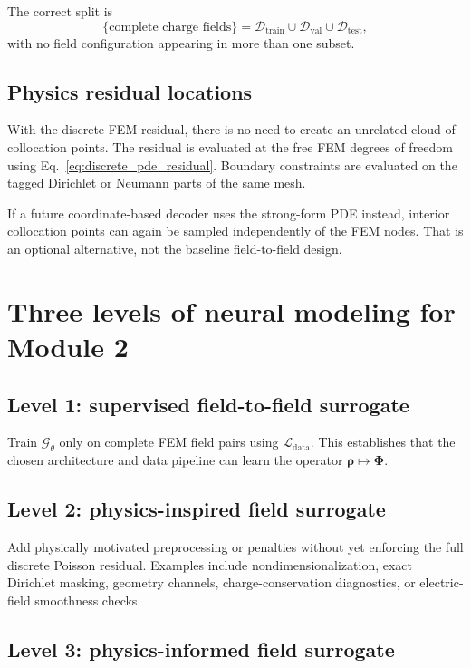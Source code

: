 \documentclass[11pt]{article}
\newcommand{\Ldata}{\mathcal{L}_{\mathrm{data}}}
\begin{document}
The correct split is
\begin{equation}
\{\text{complete charge fields}\}
=\mathcal{D}_{\mathrm{train}}\cup\mathcal{D}_{\mathrm{val}}\cup\mathcal{D}_{\mathrm{test}},
\end{equation}
with no field configuration appearing in more than one subset.

\subsection{Physics residual locations}

With the discrete FEM residual, there is no need to create an unrelated cloud of collocation points. The residual is evaluated at the free FEM degrees of freedom using Eq.~\eqref{eq:discrete_pde_residual}. Boundary constraints are evaluated on the tagged Dirichlet or Neumann parts of the same mesh.

If a future coordinate-based decoder uses the strong-form PDE instead, interior collocation points can again be sampled independently of the FEM nodes. That is an optional alternative, not the baseline field-to-field design.

\section{Three levels of neural modeling for Module 2}

\subsection{Level 1: supervised field-to-field surrogate}

Train $\mathcal{G}_{\theta}$ only on complete FEM field pairs using $\Ldata$. This establishes that the chosen architecture and data pipeline can learn the operator $\bm{\rho}\mapsto\bm{\Phi}$.

\subsection{Level 2: physics-inspired field surrogate}

Add physically motivated preprocessing or penalties without yet enforcing the full discrete Poisson residual. Examples include nondimensionalization, exact Dirichlet masking, geometry channels, charge-conservation diagnostics, or electric-field smoothness checks.

\subsection{Level 3: physics-informed field surrogate}
\end{document}
